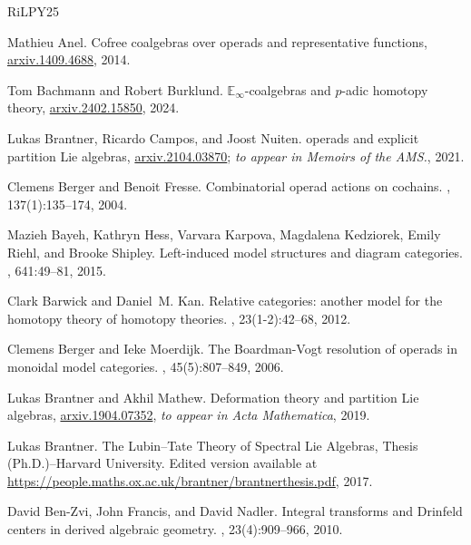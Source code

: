 \documentclass{proc-l}
\theoremstyle{plain}
\theoremstyle{definition}
\theoremstyle{remark}
\begin{document}
\newcommand{\etalchar}[1]{$^{#1}$}
\begin{thebibliography}{RiLPY25}

Mathieu Anel.
\newblock Cofree coalgebras over operads and representative functions,
  \href{https://arxiv.org/abs/1409.4688}{arxiv.1409.4688}, 2014.

Tom Bachmann and Robert Burklund.
\newblock $\mathbb{E}_{\infty}$-coalgebras and $p$-adic homotopy theory,
  \href{https://arxiv.org/abs/2402.15850}{arxiv.2402.15850}, 2024.

Lukas Brantner, Ricardo Campos, and Joost Nuiten.
 operads and explicit partition {L}ie algebras,
  \href{https://arxiv.org/abs/2104.03870}{arxiv.2104.03870}; \textit{ to appear
  in Memoirs of the AMS.}, 2021.

Clemens Berger and Benoit Fresse.
\newblock Combinatorial operad actions on cochains.
, 137(1):135--174, 2004.

\bibitem[BHK{\etalchar{+}}15]{BHKKRS}
Mazieh Bayeh, Kathryn Hess, Varvara Karpova, Magdalena Kedziorek, Emily Riehl,
  and Brooke Shipley.
\newblock Left-induced model structures and diagram categories.
, 641:49--81, 2015.

Clark Barwick and Daniel~M. Kan.
\newblock Relative categories: another model for the homotopy theory of
  homotopy theories.
, 23(1-2):42--68, 2012.

Clemens Berger and Ieke Moerdijk.
\newblock The {Boardman}-{Vogt} resolution of operads in monoidal model
  categories.
, 45(5):807--849, 2006.

Lukas Brantner and Akhil Mathew.
\newblock Deformation theory and partition {L}ie algebras,
  \href{https://arxiv.org/abs/1904.07352}{arxiv.1904.07352}, \textit{to appear
  in Acta Mathematica}, 2019.

Lukas Brantner.
\newblock The {L}ubin--{T}ate {T}heory of {S}pectral {L}ie Algebras, {T}hesis
  ({P}h.{D}.)--{H}arvard {U}niversity. Edited version available at
  \href{https://people.maths.ox.ac.uk/brantner/brantnerthesis.pdf}{https://people.maths.ox.ac.uk/brantner/brantnerthesis.pdf},
  2017.

David Ben-Zvi, John Francis, and David Nadler.
\newblock Integral transforms and {D}rinfeld centers in derived algebraic
  geometry.
, 23(4):909--966, 2010.


\end{thebibliography}
\end{document}
